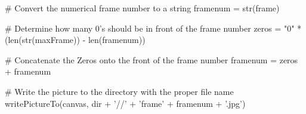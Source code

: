 \begin{exercises}
\begin{ex}
\begin{example}
    # Convert the numerical frame number to a string
    framenum = str(frame)

    # Determine how many 0's should be in front of the frame number
    zeros = "0" * (len(str(maxFrame)) - len(framenum))

    # Concatenate the Zeros onto the front of the frame number
    framenum = zeros + framenum
  
    # Write the picture to the directory with the proper file name
    writePictureTo(canvas, dir + '//' + 'frame' + framenum + '.jpg')
\end{example}
\end{ex}

\end{exercises}
